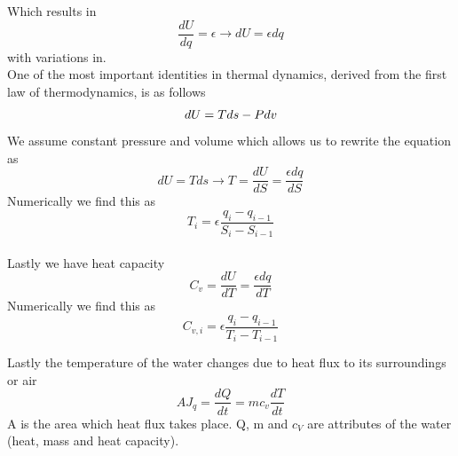 \documentclass[reprint,english,notitlepage]{revtex4-2}
\begin{document}
Which results in
\begin{equation}
  \frac{dU}{dq} = \epsilon \rightarrow dU = \epsilon dq
\end{equation}
with variations in.\\

One of the most important identities in thermal dynamics, derived from the first law of thermodynamics, is as follows
\begin{equation}
dU = Tds - Pdv \\
\end{equation}
We assume constant pressure and volume which allows us to rewrite the equation as
\begin{equation}
  dU = Tds \rightarrow T = \frac{dU}{dS} = \frac{\epsilon dq}{dS}
\end{equation}
Numerically we find this as
\begin{equation}
  T_i = \epsilon\frac{q_i - q_{i -1}}{S_i - S_{i -1}}
\end{equation}
\\
Lastly we have heat capacity
\begin{equation}
C_v = \frac{dU}{dT} = \frac{\epsilon dq}{dT}
\end{equation}
Numerically we find this as
\begin{equation}
  C_{v, i} = \epsilon\frac{q_i - q_{i -1}}{T_i - T_{i -1}}
\end{equation}

Lastly the temperature of the water changes due to heat flux to its surroundings or air
\begin{equation}
  AJ_q = \frac{dQ}{dt} = mc_v\frac{dT}{dt}
  \label{eq: heatflux}
\end{equation}
A is the area which heat flux takes place. Q, m and $c_V$ are attributes of the water (heat, mass and heat capacity).
\end{document}
